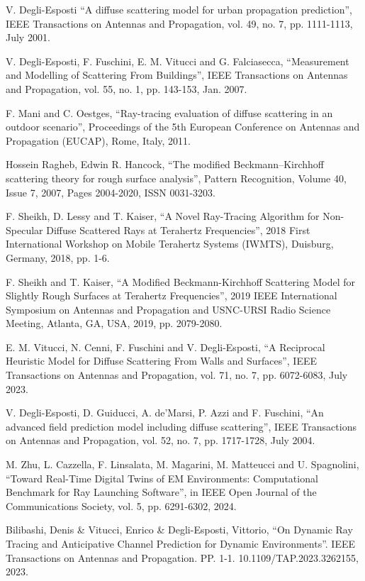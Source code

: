 \documentclass[lettersize,journal]{IEEEtran}
\begin{document}
\newpage
\begin{thebibliography}{1}
   

   V. Degli-Esposti ``A diffuse scattering model for urban propagation prediction'', IEEE Transactions on Antennas and Propagation, vol. 49, no. 7, pp. 1111-1113, July 2001.

   V. Degli-Esposti, F. Fuschini, E. M. Vitucci and G. Falciasecca, ``Measurement and Modelling of Scattering From Buildings'', IEEE Transactions on Antennas and Propagation, vol. 55, no. 1, pp. 143-153, Jan. 2007.

   F. Mani and C. Oestges, ``Ray-tracing evaluation of diffuse scattering in an outdoor scenario'', Proceedings of the 5th European Conference on Antennas and Propagation (EUCAP), Rome, Italy, 2011.

   Hossein Ragheb, Edwin R. Hancock, ``The modified Beckmann–Kirchhoff scattering theory for rough surface analysis'', Pattern Recognition, Volume 40, Issue 7, 2007, Pages 2004-2020, ISSN 0031-3203.

   F. Sheikh, D. Lessy and T. Kaiser, ``A Novel Ray-Tracing Algorithm for Non-Specular Diffuse Scattered Rays at Terahertz Frequencies'', 2018 First International Workshop on Mobile Terahertz Systems (IWMTS), Duisburg, Germany, 2018, pp. 1-6.

   F. Sheikh and T. Kaiser, ``A Modified Beckmann-Kirchhoff Scattering Model for Slightly Rough Surfaces at Terahertz Frequencies'', 2019 IEEE International Symposium on Antennas and Propagation and USNC-URSI Radio Science Meeting, Atlanta, GA, USA, 2019, pp. 2079-2080.

   E. M. Vitucci, N. Cenni, F. Fuschini and V. Degli-Esposti, ``A Reciprocal Heuristic Model for Diffuse Scattering From Walls and Surfaces'', IEEE Transactions on Antennas and Propagation, vol. 71, no. 7, pp. 6072-6083, July 2023.

   V. Degli-Esposti, D. Guiducci, A. de'Marsi, P. Azzi and F. Fuschini, ``An advanced field prediction model including diffuse scattering'', IEEE Transactions on Antennas and Propagation, vol. 52, no. 7, pp. 1717-1728, July 2004.

   M. Zhu, L. Cazzella, F. Linsalata, M. Magarini, M. Matteucci and U. Spagnolini, ``Toward Real-Time Digital Twins of EM Environments: Computational Benchmark for Ray Launching Software'', in IEEE Open Journal of the Communications Society, vol. 5, pp. 6291-6302, 2024.

   Bilibashi, Denis \& Vitucci, Enrico \& Degli-Esposti, Vittorio, ``On Dynamic Ray Tracing and Anticipative Channel Prediction for Dynamic Environments''. IEEE Transactions on Antennas and Propagation. PP. 1-1. 10.1109/TAP.2023.3262155, 2023.

\end{thebibliography}
\end{document}
